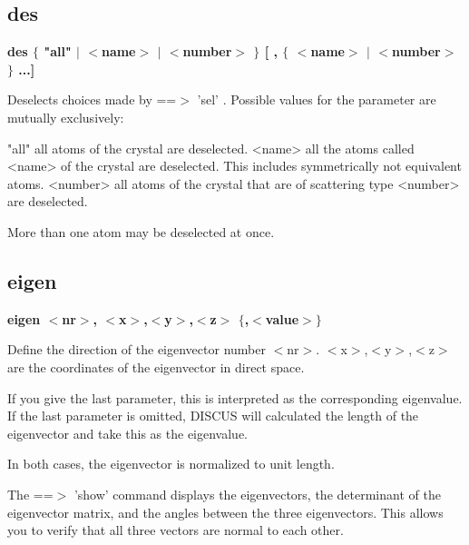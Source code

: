 \subsection*{des}
{\bf des $ \{$ "all" $| $ $ <$name$> $ $| $ $ <$number$> $ $\} $ [ , $ \{$ $ <$name$> $ $| $ $ <$number$> $ $\} $ ...] \par }
\par
\vspace{3pt}
Deselects choices made by ==$> $ 'sel' . Possible values 
for the parameter are mutually exclusively: 
\par
\begin{MacVerbatim}
"all"     all atoms of the crystal are deselected.
<name>    all the atoms called <name> of the crystal are deselected.
          This includes symmetrically not equivalent atoms.
<number>  all atoms of the crystal that are of scattering type <number>
          are deselected.
\end{MacVerbatim}
More than one atom may be deselected at once. 
\subsection*{eigen}
{\bf eigen $ <$nr$> $, $ <$x$> $,$ <$y$> $,$ <$z$> $ $ \{$,$ <$value$> $$\} $ \par }
\par
\vspace{3pt}
Define the direction of the eigenvector number $ <$nr$> $. $ <$x$> $,$ <$y$> $,$ <$z$> $ are 
the coordinates of the eigenvector in direct space. 
\par
If you give the last parameter, this is interpreted as the 
corresponding eigenvalue. 
If the last parameter is omitted, DISCUS will calculated the 
length of the eigenvector and take this as the eigenvalue. 
\par
In both cases, the eigenvector is normalized to unit length. 
\par
The ==$> $ 'show' command displays the eigenvectors, the determinant 
of the eigenvector matrix, and the angles between the 
three eigenvectors. This allows you to verify that all three 
vectors are normal to each other. 
